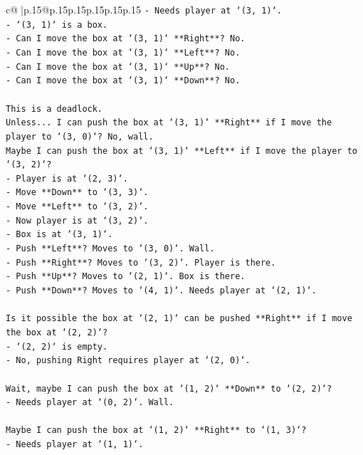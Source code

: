 \documentclass{article}
\begin{document}
{\begin{supertabular}{c@{$\;$}|p{.15\linewidth}@{}p{.15\linewidth}p{.15\linewidth}p{.15\linewidth}p{.15\linewidth}p{.15\linewidth}}
{{{\texttt{{-} Needs player at `(3, 1)`.} \\
\texttt{{-} `(3, 1)` is a box.} \\
\texttt{{-} Can I move the box at `(3, 1)` **Right**? No.} \\
\texttt{{-} Can I move the box at `(3, 1)` **Left**? No.} \\
\texttt{{-} Can I move the box at `(3, 1)` **Up**? No.} \\
\texttt{{-} Can I move the box at `(3, 1)` **Down**? No.} \\
\\ 
\texttt{This is a deadlock.} \\
\texttt{Unless... I can push the box at `(3, 1)` **Right** if I move the player to `(3, 0)`? No, wall.} \\
\texttt{Maybe I can push the box at `(3, 1)` **Left** if I move the player to `(3, 2)`?} \\
\texttt{{-} Player is at `(2, 3)`.} \\
\texttt{{-} Move **Down** to `(3, 3)`.} \\
\texttt{{-} Move **Left** to `(3, 2)`.} \\
\texttt{{-} Now player is at `(3, 2)`.} \\
\texttt{{-} Box is at `(3, 1)`.} \\
\texttt{{-} Push **Left**? Moves to `(3, 0)`. Wall.} \\
\texttt{{-} Push **Right**? Moves to `(3, 2)`. Player is there.} \\
\texttt{{-} Push **Up**? Moves to `(2, 1)`. Box is there.} \\
\texttt{{-} Push **Down**? Moves to `(4, 1)`. Needs player at `(2, 1)`.} \\
\\ 
\texttt{Is it possible the box at `(2, 1)` can be pushed **Right** if I move the box at `(2, 2)`?} \\
\texttt{{-} `(2, 2)` is empty.} \\
\texttt{{-} No, pushing Right requires player at `(2, 0)`.} \\
\\ 
\texttt{Wait, maybe I can push the box at `(1, 2)` **Down** to `(2, 2)`?} \\
\texttt{{-} Needs player at `(0, 2)`. Wall.} \\
\\ 
\texttt{Maybe I can push the box at `(1, 2)` **Right** to `(1, 3)`?} \\
\texttt{{-} Needs player at `(1, 1)`.} \\
}}}
\end{supertabular}}
\end{document}
